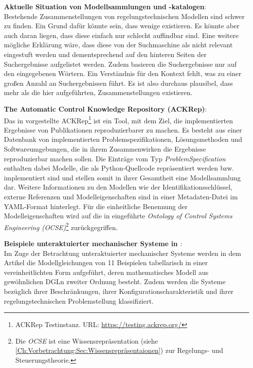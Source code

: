 \textbf{Aktuelle Situation von Modellsammlungen und -katalogen}: \\
Bestehende Zusammenstellungen von regelungstechnischen Modellen sind schwer zu finden. Ein Grund dafür könnte sein, dass wenige existieren. Es könnte aber auch daran liegen, dass diese einfach nur schlecht auffindbar sind. Eine weitere mögliche Erklärung wäre, dass diese von der Suchmaschine als nicht relevant eingestuft werden und dementsprechend auf den hinteren Seiten der Suchergebnisse aufgelistet werden. Zudem basieren die Suchergebnisse nur auf den eingegebenen Wörtern. Ein Verständnis für den Kontext fehlt, was zu einer großen Anzahl an Suchergebnissen führt. Es ist also durchaus plausibel, dass mehr als die hier aufgeführten, Zusammenstellungen existieren. 

\textbf{The Automatic Control Knowledge Repository (ACKRep)}:\\
Das in \cite{KNHE20a} vorgestellte ACKRep\footnote{ACKRep Testinstanz. \tiny{URL}\normalsize: \url{https://testing.ackrep.org/}} ist ein Tool, mit dem Ziel, die implementierten Ergebnisse von Publikationen reproduzierbarer zu machen. Es besteht aus einer Datenbank von implementierten Problemspezifikationen, Lösungsmethoden und Softwareumgebungen, die in ihrem Zusammenwirken die Ergebnisse reproduzierbar machen sollen. Die Einträge vom Typ \textit{ProblemSpecification} enthalten dabei Modelle, die als Python-Quellcode repräsentiert werden bzw. implementiert sind und stellen somit in ihrer Gesamtheit eine Modellsammlung dar. Weitere Informationen zu den Modellen wie der Identifikationsschlüssel, externe Referenzen und Modelleigenschaften sind in einer Metadaten-Datei im YAML-Format hinterlegt. Für die einheitliche Benennung der Modelleigenschaften wird auf die in \cite{KNHE20b} eingeführte \textit{Ontology of Control Systems Engineering (OCSE)}\footnote{Die \textit{OCSE} ist eine Wissensrepräsentation (siehe \autoref{Ch:Vorbetrachtung:Sec:Wissensrepräsentaionen}) zur Regelungs- und Steuerungstheorie.} zurückgegriffen.

\textbf{Beispiele unteraktuierter mechanischer Systeme in \cite{LIYU13}}:\\
Im Zuge der Betrachtung unteraktuierter mechanischer Systeme werden in dem Artikel die Modellgleichungen von 11 Beispielen tabellarisch in einer vereinheitlichten Form aufgeführt, deren mathematisches Modell aus gewöhnlichen DGLn zweiter Ordnung besteht. Zudem werden die Systeme bezüglich ihrer Beschränkungen, ihrer Konfigurationscharakteristik und ihrer regelungstechnischen Problemstellung klassifiziert.

